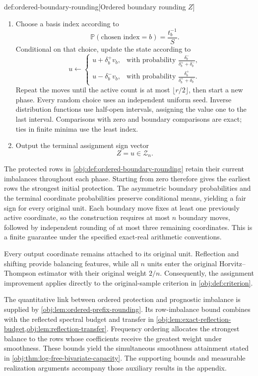 \documentclass[11pt]{article}
\begin{document}
\begin{algorithmv}{def:ordered-boundary-rounding}[Ordered boundary rounding $Z$]
\begin{enumerate}
\item Choose a basis index according to
\[
\mathbb P(\text{chosen index}=b)=\frac{t_b^{-1}}{S}.
\]
Conditional on that choice, update the state according to
\[
u\leftarrow
\begin{cases}
u+\delta_b^+v_b,
&\text{with probability }\displaystyle\frac{\delta_b^-}{\delta_b^++\delta_b^-},\\[6pt]
u-\delta_b^-v_b,
&\text{with probability }\displaystyle\frac{\delta_b^+}{\delta_b^++\delta_b^-}.
\end{cases}
\]
Repeat the moves until the active count is at most \(\lfloor r/2\rfloor\), then start a new phase. Every random choice uses an independent uniform seed. Inverse distribution functions use half-open intervals, assigning the value one to the last interval. Comparisons with zero and boundary comparisons are exact; ties in finite minima use the least index.

\item Output the terminal assignment sign vector
\[
Z=u\in\mathcal Z_n.
\]
\end{enumerate}
\end{algorithmv}

The protected rows in \cref{obj:def:ordered-boundary-rounding} retain their current imbalances throughout each phase. Starting from zero therefore gives the earliest rows the strongest initial protection. The asymmetric boundary probabilities and the terminal coordinate probabilities preserve conditional means, yielding a fair sign for every original unit. Each boundary move fixes at least one previously active coordinate, so the construction requires at most \(n\) boundary moves, followed by independent rounding of at most three remaining coordinates. This is a finite guarantee under the specified exact-real arithmetic conventions.

Every output coordinate remains attached to its original unit. Reflection and shifting provide balancing features, while all \(n\) units enter the original Horvitz--Thompson estimator with their original weight \(2/n\). Consequently, the assignment improvement applies directly to the original-sample criterion in \cref{obj:def:criterion}.

The quantitative link between ordered protection and prognostic imbalance is supplied by \cref{obj:lem:ordered-prefix-rounding}. Its row-imbalance bound combines with the reflected spectral budget and transfer in \cref{obj:lem:exact-reflection-budget,obj:lem:reflection-transfer}. Frequency ordering allocates the strongest balance to the rows whose coefficients receive the greatest weight under smoothness. These bounds yield the simultaneous smoothness attainment stated in \cref{obj:thm:log-free-bivariate-capacity}. The supporting bounds and measurable realization arguments accompany those auxiliary results in the appendix.
\end{document}

